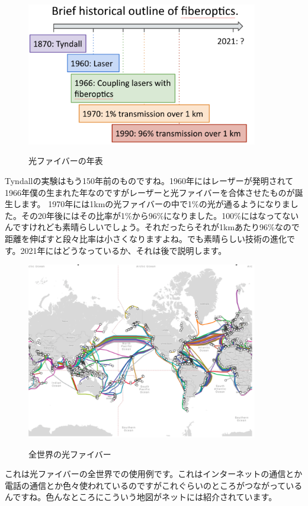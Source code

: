\begin{figure}[H]
    \centering
    \includegraphics[width=0.9\textwidth]{lesson7/fiberoptics_timeline.pdf}
    \label{図: 1}
    \caption{光ファイバーの年表}
\end{figure}
Tyndallの実験はもう150年前のものですね。1960年にはレーザーが発明されて1966年僕の生まれた年なのですがレーザーと光ファイバーを合体させたものが誕生します。
1970年には1kmの光ファイバーの中で1\%の光が通るようになりました。その20年後にはその比率が1\%から96\%になりました。100\%にはなってないんですけれども素晴らしいでしょう。それだったらそれが1kmあたり96\%なので距離を伸ばすと段々比率は小さくなりますよね。でも素晴らしい技術の進化です。2021年にはどうなっているか、それは後で説明します。

\begin{figure}[H]
    \centering
    \includegraphics[width=0.9\textwidth]{lesson7/fibreoptics_map.pdf}
    \label{図: 1}
    \caption{全世界の光ファイバー}
\end{figure}
これは光ファイバーの全世界での使用例です。これはインターネットの通信とか
電話の通信とか色々使われているのですがこれぐらいのところがつながっているんですね。色んなところにこういう地図がネットには紹介されています。


